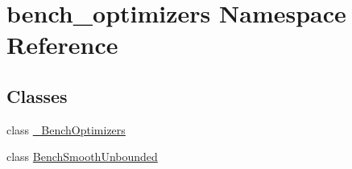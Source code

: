 \hypertarget{namespacebench__optimizers}{}\section{bench\+\_\+optimizers Namespace Reference}
\label{namespacebench__optimizers}
\subsection*{Classes}
\begin{DoxyCompactItemize}
\item 
class \hyperlink{classbench__optimizers_1_1__BenchOptimizers}{\+\_\+\+Bench\+Optimizers}
\item 
class \hyperlink{classbench__optimizers_1_1BenchSmoothUnbounded}{Bench\+Smooth\+Unbounded}
\end{DoxyCompactItemize}
